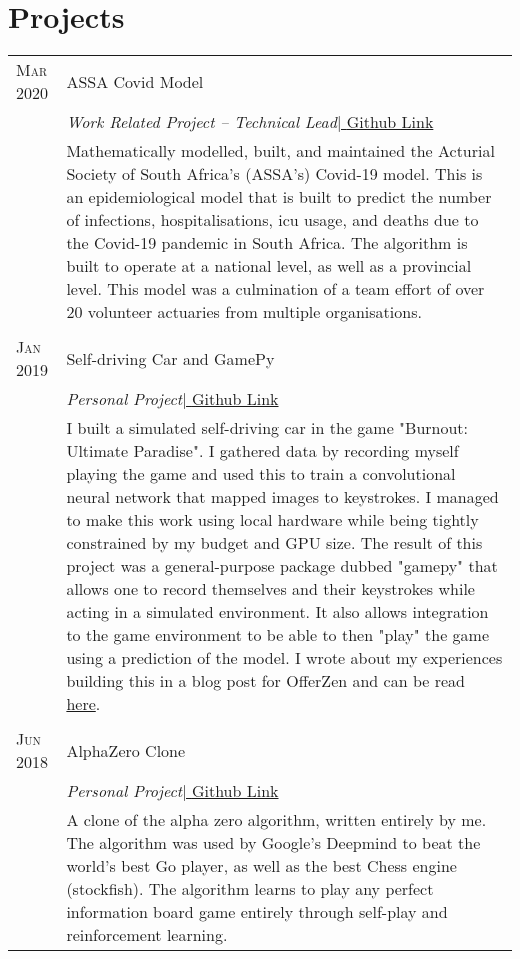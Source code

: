 \section{Projects}

\begin{supertabular}{p{1.8cm}|p{12cm}}
	\textsc{Mar 2020} & ASSA Covid Model \\
	& \small\emph{Work Related Project -- Technical Lead}\href{https://github.com/Percept-Health-Solve/seir-model}{\hfill| \footnotesize{Github Link}}\\
	& \footnotesize{Mathematically modelled, built, and maintained the Acturial Society of South Africa's (ASSA's) Covid-19 model. This is an epidemiological model that is built to predict the number of infections, hospitalisations, icu usage, and deaths due to the Covid-19 pandemic in South Africa. The algorithm is built to operate at a national level, as well as a provincial level. This model was a culmination of a team effort of over 20 volunteer actuaries from multiple organisations.} \\
	 \\
	\textsc{Jan 2019} & Self-driving Car and GamePy \\
	& \small\emph{Personal Project}\href{https://github.com/jasonrobwebster/gamepy}{\hfill| \footnotesize{Github Link}}\\
	& \footnotesize{I built a simulated self-driving car in the game "Burnout: Ultimate Paradise". I gathered data by recording myself playing the game and used this to train a convolutional neural network that mapped images to keystrokes. I managed to make this work using local hardware while being tightly constrained by my budget and GPU size. The result of this project was a general-purpose package dubbed "gamepy" that allows one to record themselves and their keystrokes while acting in a simulated environment. It also allows integration to the game environment to be able to then "play" the game using a prediction of the model. I wrote about my experiences building this in a blog post for OfferZen and can be read \href{https://www.offerzen.com/blog/how-to-develop-a-self-driving-car-in-under-a-week}{here}.} \\
	 \\
	\textsc{Jun 2018} & AlphaZero Clone \\
	& \small\emph{Personal Project}\href{https://github.com/jasonrobwebster/alphazero-clone}{\hfill| \footnotesize{Github Link}}\\
	& \footnotesize{A clone of the alpha zero algorithm, written entirely by me. The algorithm was used by Google's Deepmind to beat the world's best Go player, as well as the best Chess engine (stockfish). The algorithm learns to play any perfect information board game entirely through self-play and reinforcement learning.} \\

\end{supertabular}
